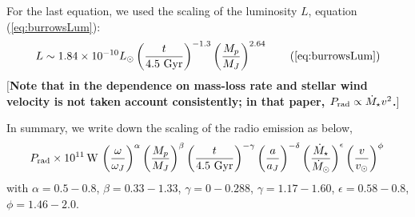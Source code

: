 \documentclass{emulateapj}
\def\memoYF#1{\color{red}$[${\bf #1}$]$ \color{black}}
\begin{document}
For the last equation, we used the scaling of the luminosity $L$, equation (\ref{eq:burrowsLum}):
\begin{equation}
L \sim 1.84\times10^{-10} L_\odot \left( \frac{t}{4.5 \rm~Gyr} \right)^{-1.3} \left( \frac{M_p}{M_J} \right)^{2.64} \tag{\ref{eq:burrowsLum}}
\end{equation} 
\memoYF{Note that in \citet{ignace2010} the dependence on mass-loss rate and stellar wind velocity is not taken account consistently; in that paper, $P_{\rm rad} \propto \dot M_{\star } v^2$.}

In summary, we write down the scaling of the radio emission as below, 
\begin{equation}
P_{\rm rad} \times 10^{11} \,{\rm W}\, \left( \frac{\omega}{\omega _J} \right)^{\alpha } \left( \frac{M_p}{M_J} \right)^{\beta }  \left( \frac{t}{4.5 \rm~Gyr} \right)^{-\gamma }  \left( \frac{a}{a_J} \right)^{-\delta }  \left( \frac{\dot M_\star}{\dot M_{\odot}} \right)^{\epsilon } \left( \frac{v}{v_{\odot}} \right)^{\phi } \, \\
\end{equation} 
with $\alpha = 0.5-0.8$, $\beta = 0.33-1.33$, $\gamma = 0-0.288$, $\gamma = 1.17-1.60$, $\epsilon = 0.58-0.8$, $\phi = 1.46-2.0$. 
\end{document}
